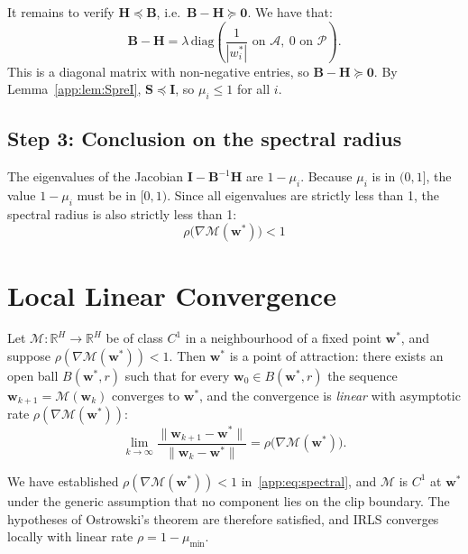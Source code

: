 It remains to verify $\mathbf{H}\preceq\mathbf{B}$, i.e.\ $\mathbf{B}-\mathbf{H}\succeq\mathbf{0}$.
We have that:
\[
    \mathbf{B}-\mathbf{H}
    = \lambda\,\mathrm{diag}\!\left(\frac{1}{|w^*_i|}\text{ on }\mathcal{A},\ 0\text{ on }\mathcal{P}\right).
\]
This is a diagonal matrix with non-negative entries, so $\mathbf{B}-\mathbf{H}\succeq\mathbf{0}$.
By Lemma~\ref{app:lem:SpreI}, $\mathbf{S}\preceq\mathbf{I}$, so $\mu_i\le 1$ for all $i$.


\subsection{Step 3: Conclusion on the spectral radius}
The eigenvalues of the Jacobian $\mathbf{I} - \mathbf{B}^{-1}\mathbf{H}$ are $1 - \mu_i$.
Because $\mu_i$ is in $(0, 1]$, the value $1 - \mu_i$ must be in $[0, 1)$. Since all eigenvalues are strictly less than 1, the spectral radius is also strictly less than 1:
\begin{equation}
    \rho\bigl(\nabla\mathcal{M}(\mathbf{w}^*)\bigr) < 1
    \label{app:eq:spectral}
\end{equation}

\section{Local Linear Convergence}
\label{app:sec:ostrowski}

\begin{theorem}
Let $\mathcal{M}:\mathbb{R}^H\to\mathbb{R}^H$ be of class $C^1$ in a neighbourhood of a
fixed point $\mathbf{w}^*$, and suppose $\rho(\nabla\mathcal{M}(\mathbf{w}^*))<1$.
Then $\mathbf{w}^*$ is a point of attraction: there exists an open ball $B(\mathbf{w}^*,r)$
such that for every $\mathbf{w}_0\in B(\mathbf{w}^*,r)$ the sequence
$\mathbf{w}_{k+1}=\mathcal{M}(\mathbf{w}_k)$ converges to $\mathbf{w}^*$, and the convergence
is \emph{linear} with asymptotic rate $\rho(\nabla\mathcal{M}(\mathbf{w}^*))$:
\[
    \lim_{k\to\infty}\frac{\|\mathbf{w}_{k+1}-\mathbf{w}^*\|}{\|\mathbf{w}_k-\mathbf{w}^*\|}
    = \rho\!\bigl(\nabla\mathcal{M}(\mathbf{w}^*)\bigr).
\]
\end{theorem}
 
We have established $\rho(\nabla\mathcal{M}(\mathbf{w}^*))<1$ in~\eqref{app:eq:spectral},
and $\mathcal{M}$ is $C^1$ at $\mathbf{w}^*$ under the generic assumption that no component
lies on the clip boundary. The hypotheses of Ostrowski's theorem are therefore satisfied,
and IRLS converges locally with linear rate $\rho=1-\mu_{\min}$.

